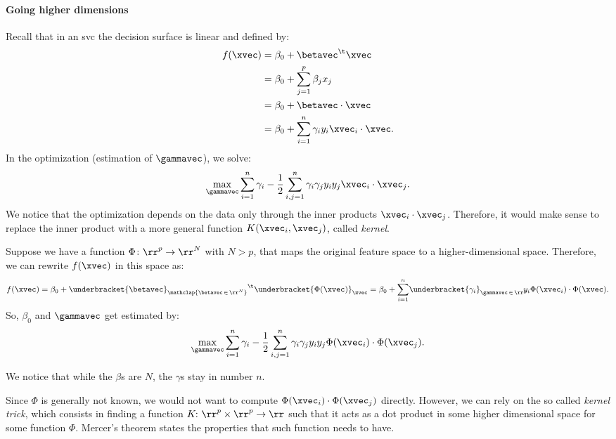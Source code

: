 \paragraph{Going higher dimensions}
Recall that in an \acs{svc} the decision surface is linear and defined by:
\begin{equation}
    \begin{aligned}
        f(\xvec) & = \beta_0 + \betavec^\t\xvec                                \\
                 & = \beta_0 + \sum_{j=1}^p\beta_jx_j                          \\
                 & = \beta_0 + \betavec \cdot \xvec                            \\
                 & = \beta_0 + \sum_{i = 1}^n \gamma_i y_i \xvec_i\cdot \xvec.
    \end{aligned}
\end{equation}
In the optimization (estimation of $\gammavec$), we solve:
\begin{equation}
    \max_{\gammavec} \sum_{i = 1}^n \gamma_i - \frac{1}{2}\sum_{i,j = 1}^{n} \gamma_i\gamma_j y_i y_j \xvec_i \cdot \xvec_j.
\end{equation}
We notice that the optimization depends on the data only through the inner products $\xvec_i \cdot \xvec_j$. Therefore, it would make sense to replace the inner product with a more general function $K(\xvec_i, \xvec_j)$, called \emph{kernel}.

Suppose we have a function $\Phi\colon \rr^p \to \rr^N$ with $N > p$, that maps the original feature space to a higher-dimensional space. Therefore, we can rewrite $f(\xvec)$ in this space as:
\begin{equation}
    f(\xvec) = \beta_0 + {\underbracket{\betavec}_{\mathclap{\betavec\,\in\,\rr^N}}}^\t \underbracket{\Phi(\xvec)}_{\zvec} = \beta_0 + \sum_{i = 1}^n\negthinspace\underbracket{\gamma_i}_{\gammavec\,\in\,\rr^n} \negthickspace\negthickspace y_i \Phi(\xvec_i) \cdot \Phi(\xvec).
\end{equation}
So, $\beta_0$ and $\gammavec$ get estimated by:
\begin{equation}
    \max_{\gammavec} \sum_{i = 1}^n \gamma_i - \frac{1}{2}\sum_{i,j = 1}^{n} \gamma_i\gamma_j y_i y_j \Phi(\xvec_i) \cdot \Phi(\xvec_j).
\end{equation}
\begin{note}
    We notice that while the $\beta$s are $N$, the $\gamma$s stay in number $n$.
\end{note}
Since $\Phi$ is generally not known, we would not want to compute $\Phi(\xvec_i) \cdot \Phi(\xvec_j)$ directly. However, we can rely on the so called \emph{kernel trick}, which consists in finding a function $K\negthinspace\colon \rr^p \times \rr^p \to \rr$ such that it acts as a dot product in some higher dimensional space for some function $\Phi$. Mercer's theorem states the properties that such function needs to have.

